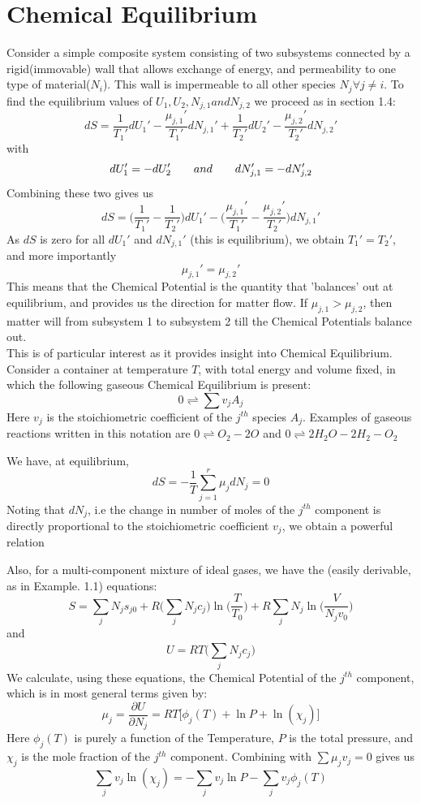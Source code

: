 \documentclass[oneside]{book}
\begin{document}
\section{Chemical Equilibrium}
Consider a simple composite system consisting of two subsystems connected by a rigid(immovable) wall that allows exchange of energy, and permeability to one type of material($N_i$). This wall is impermeable to all other species $N_j \forall j \neq i$. To find the equilibrium values of $U_1, U_2, N_{j,1} and N_{j,2}$ we proceed as in section 1.4:
\[ dS = \frac{1}{T_1'}dU_1'  - \frac{\mu_{j,1}'}{T_1'}dN_{j,1}' + \frac{1}{T_2'}dU_2' - \frac{\mu_{j,2}'}{T_2'}dN_{j,2}'\]
with \[dU_1' = -dU_2' \hspace{0.7cm} and \hspace{0.7cm} dN_{j,1}' = -dN_{j,2}' \]
Combining these two gives us
\[ dS = \Big(\frac{1}{T_1'} - \frac{1}{T_2'}\Big)dU_1'  - \Big(\frac{\mu_{j,1}'}{T_1'} - \frac{\mu_{j,2}'}{T_2'} \Big)dN_{j,1}' \]
As $dS$ is zero for all $dU_1'$ and $dN_{j,1}'$ (this is equilibrium), we obtain $T_1' = T_2'$, and more importantly
\[ \mu_{j,1}' = \mu_{j,2}' \]
This means that the Chemical Potential is the quantity that 'balances' out at equilibrium, and provides us the direction for matter flow. If $\mu_{j,1} > \mu_{j,2}$, then matter will from subsystem 1 to subsystem 2 till the Chemical Potentials balance out.\\

This is of particular interest as it provides insight into Chemical Equilibrium. Consider a container at temperature $T$, with total energy and volume fixed, in which the following gaseous Chemical Equilibrium is present:
\[  0 \rightleftharpoons \sum v_jA_j \]
Here $v_j$ is the stoichiometric coefficient of the $j^{th}$ species $A_j$. Examples of gaseous reactions written in this notation are $0 \rightleftharpoons O_2 - 2O $ and $0 \rightleftharpoons 2H_2O - 2H_2 - O_2$

We have, at equilibrium,
 \[dS =  - \frac{1}{T}\sum_{j = 1}^{r}\mu_jdN_j = 0\]
 Noting that $dN_j$, i.e the change in number of moles of the $j^{th}$ component is directly proportional to the stoichiometric coefficient $v_j $, we obtain a powerful relation
 \begin{center} \end{center}
 Also, for a multi-component mixture of ideal gases, we have the (easily derivable, as in Example. 1.1) equations:
\[S = \sum_{j}^{}N_js_{j0} + R\Bigg(\sum_{j}^{}N_jc_{j}\Bigg)\ln \Bigg(\frac{T}{T_0}\Bigg) + R\sum_{j}^{}N_j \ln \Bigg(\frac{V}{N_jv_0}\Bigg)\]
and
\[U = RT\Bigg(\sum_{j}^{}N_jc_{j}\Bigg)\]
We calculate, using these equations, the Chemical Potential of the $j^{th}$ component, which is in most general terms given by:
\[ \mu_j = \frac{\partial U}{\partial N_j}  = RT\bigg[\phi_j(T) + \ln P + \ln (\chi_j) \bigg] \]
Here $\phi_j(T)$ is purely a function of the Temperature, $P$ is the total pressure, and $\chi_j$ is the mole fraction of the $j^{th}$ component. Combining with $\sum\mu_jv_j = 0$ gives us 
\[ \sum_{j }^{}v_j\ln (\chi_j) = -\sum_{j}^{}v_j \ln P - \sum_{j}v_j\phi_j(T) \]
\end{document}

